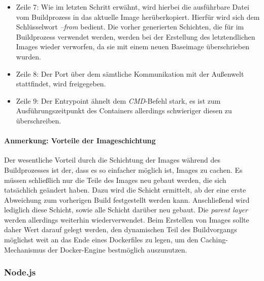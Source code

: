 \begin{itemize}
  \item Zeile 7: Wie im letzten Schritt erwähnt, wird hierbei die ausführbare Datei vom Buildprozess in das aktuelle Image herüberkopiert. Hierfür wird sich dem Schlüsselwort \emph{--from} bedient. Die vorher generierten Schichten, die für im Buildprozess verwendet werden, werden bei der Erstellung des letztendlichen Images wieder verworfen, da sie mit einem neuen Baseimage überschrieben wurden.
  \item Zeile 8: Der Port über dem sämtliche Kommunikation mit der Außenwelt stattfindet, wird freigegeben. 
  \item Zeile 9: Der Entrypoint ähnelt dem \emph{CMD}-Befehl stark, es ist zum Ausführungszeitpunkt des Containers allerdings schwieriger diesen zu überschreiben.
\end{itemize}


\paragraph{Anmerkung: Vorteile der Imageschichtung \checkmark} Der wesentliche Vorteil durch die Schichtung der Images während des Buildprozesses ist der, dass es so einfacher möglich ist, Images zu cachen. Es müssen schließlich nur die Teile des Images neu gebaut werden, die sich tatsächlich geändert haben. Dazu wird die Schicht ermittelt, ab der eine erste Abweichung zum vorherigen Build festgestellt werden kann. Anschließend wird lediglich diese Schicht, sowie alle Schicht darüber neu gebaut. Die \emph{parent layer} werden allerdings weiterhin wiederverwendet. Beim Erstellen von Images sollte daher Wert darauf gelegt werden, den dynamischen Teil des Buildvorgangs möglichst weit an das Ende eines Dockerfiles zu legen, um den Caching-Mechanismus der Docker-Engine bestmöglich auszunutzen.

\subsubsection{Node.js \checkmark}

